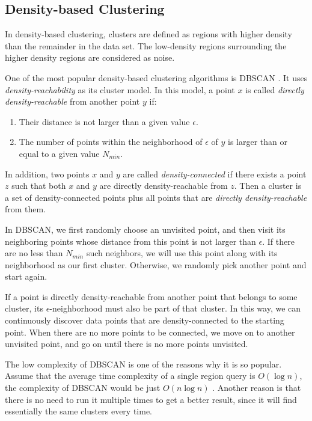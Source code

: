 \documentclass[conference]{IEEEtran}
\begin{document}
\subsection{Density-based Clustering}
In density-based clustering, clusters are defined as regions with higher density than the remainder in the data set. The low-density regions surrounding the higher density regions are considered as noise.

One of the most popular density-based clustering algorithms is DBSCAN \cite{ester1996density}. It uses \textit{density-reachability} as its cluster model. In this model, a point $x$ is called \textit{directly density-reachable} from another point $y$ if:

\begin{enumerate}
	\item Their distance is not larger than a given value $\epsilon$.
	\item The number of points within the neighborhood of $\epsilon$ of $y$ is larger than or equal to a given value $N_{min}$.
\end{enumerate}

In addition, two points $x$ and $y$ are called \textit{density-connected} if there exists a point $z$ such that both $x$ and $y$ are directly density-reachable from $z$. Then a cluster is a set of density-connected points plus all points that are \textit{directly density-reachable} from them.

In DBSCAN, we first randomly choose an unvisited point, and then visit its neighboring points whose distance from this point is not larger than $\epsilon$. If there are no less than $N_{min}$ such neighbors, we will use this point along with its neighborhood as our first cluster. Otherwise, we randomly pick another point and start again.

If a point is directly density-reachable from another point that belongs to some cluster, its $\epsilon$-neighborhood must also be part of that cluster. In this way, we can continuously discover data points that are density-connected to the starting point. When there are no more points to be connected, we move on to another unvisited point, and go on until there is no more points unvisited.

The low complexity of DBSCAN is one of the reasons why it is so popular. Assume that the average time complexity of a single region query is $O(\log n)$, the complexity of DBSCAN would be just $O(n \log n)$ \cite{ester1996density}. Another reason is that there is no need to run it multiple times to get a better result, since it will find essentially the same clusters every time.
\end{document}

